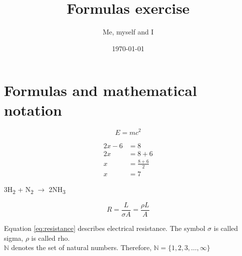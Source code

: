 \documentclass[a4paper]{article}
\title{Formulas exercise}
\author{Me, myself and I}
\date{\today}
\begin{document}
\maketitle
	


\section*{Formulas and mathematical notation}
\begin{equation*}
    E = mc^2
\end{equation*}


\begin{align*} 
2x - 6 &=  8 \\ 
2x &=  8 + 6\\
x  &= \frac{8 + 6}{2}\\
x &= 7
\end{align*}

\begin{center}
\noindent 3H\textsubscript{2} + N\textsubscript{2} $\rightarrow$ 2NH\textsubscript{3}    
\end{center}


\begin{equation}
    R = \frac{L}{{\sigma A}} = \frac{{\rho L}}{A}
    \label{eq:resistance}
\end{equation}	

\noindent Equation \ref{eq:resistance} describes electrical resistance. The symbol $\sigma$ is called sigma, $\rho$ is called rho.\\

\noindent $\mathbb{N}$ denotes the set of natural numbers. Therefore, $ \mathbb{N}=\{1,2,3,\ldots,\infty\} $



		
\end{document}

